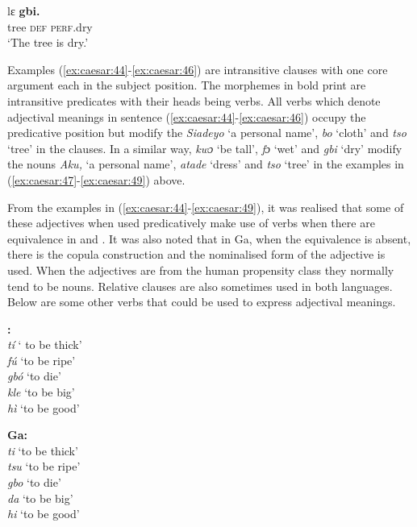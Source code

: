 \documentclass[output=paper,
modfonts
]{langscibook}
\begin{document}
\ea\label{ex:caesar:49}
 {lɛ}  \textbf{{gbi.}}\\
 tree \textsc{def} \textsc{perf}.dry\\
\glt ‘The tree is dry.’
\z

Examples (\ref{ex:caesar:44}-\ref{ex:caesar:46}) are intransitive clauses with one core argument each in the subject position. The morphemes in bold print are intransitive predicates with their heads being verbs. All verbs which denote adjectival meanings in sentence (\ref{ex:caesar:44}-\ref{ex:caesar:46}) occupy the predicative position but modify the  \textit{Siadeyo} ‘a personal name’, \textit{bo} ‘cloth’ and \textit{tso} ‘tree’ in the  clauses. In a similar way, \textit{kwɔ} ‘be tall’, \textit{fɔ} ‘wet’ and \textit{gbi} ‘dry’ modify the nouns \textit{Aku,} ‘a personal name’, \textit{atade} ‘dress’ and \textit{tso} ‘tree’ in the  examples in (\ref{ex:caesar:47}-\ref{ex:caesar:49}) above.

From the examples in (\ref{ex:caesar:44}-\ref{ex:caesar:49}), it was realised that some of these adjectives when used predicatively make use of verbs when there are equivalence in  and . It was also noted that in Ga, when the  equivalence is absent, there is the copula construction and the nominalised form of the adjective is used. When the adjectives are from the human propensity class they normally tend to be nouns. Relative clauses are also sometimes used in both languages. Below are some other verbs that could be used to express adjectival meanings.

\parbox{.4\textwidth}{
\ea 
\textbf{:}\\
\textit{tí} ‘ to be thick’ \\
\textit{fú} ‘to be ripe’  \\
\textit{gbó} ‘to die’  \\
\textit{kle} ‘to be big’  \\
\textit{hì} ‘to be good’  \\ 
\z
}
\parbox{.4\textwidth}{
\ea 
\textbf{Ga:}\\
\textit{ti}  ‘to be thick’ \\
\textit{tsu}  ‘to be ripe’ \\
\textit{gbo} ‘to die’ \\
\textit{da} ‘to be big’ \\
\textit{hi} ‘to be good’ \\ 
\z
}
\end{document}
